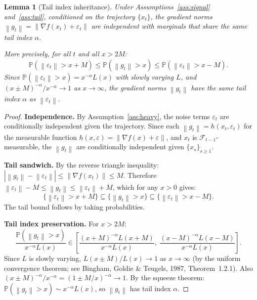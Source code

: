 \documentclass[11pt]{article}
\newtheorem{lemma}[theorem]{Lemma}
\theoremstyle{definition}
\newcommand{\Prob}{\mathbb{P}}
\newcommand{\norm}[1]{\left\| #1 \right\|}
\newcommand{\abs}[1]{\left| #1 \right|}
\newcommand{\Filt}{\mathcal{F}}
\begin{document}
\begin{lemma}[Tail index inheritance]\label{lem:tail_inherit}
Under Assumptions~\ref{ass:signal} and~\ref{ass:tail}, conditioned on the
trajectory $\{x_t\}$, the gradient norms
$\norm{g_t} = \norm{\nabla f(x_t) + \varepsilon_t}$
are independent with marginals that share the same tail index $\alpha$.

More precisely, for all $t$ and all $x > 2M$:
\[
  \Prob(\norm{\varepsilon_t} > x + M)
  \leq \Prob(\norm{g_t} > x)
  \leq \Prob(\norm{\varepsilon_t} > x - M).
\]
Since $\Prob(\norm{\varepsilon_t} > x) = x^{-\alpha}L(x)$ with slowly varying $L$,
and $(x \pm M)^{-\alpha}/x^{-\alpha} \to 1$ as $x \to \infty$, the gradient
norms $\norm{g_t}$ have the same tail index $\alpha$ as $\norm{\varepsilon_t}$.
\end{lemma}

\begin{proof}
\textbf{Independence.} By Assumption~\ref{ass:heavy}, the noise terms
$\varepsilon_t$ are conditionally independent given the trajectory. Since
each $\norm{g_t} = h(x_t, \varepsilon_t)$ for the measurable function
$h(x, \varepsilon) = \norm{\nabla f(x) + \varepsilon}$, and $x_t$ is
$\Filt_{t-1}$-measurable, the $\norm{g_t}$ are conditionally independent
given $\{x_s\}_{s \geq 1}$.

\textbf{Tail sandwich.} By the reverse triangle inequality:
$\abs{\norm{g_t} - \norm{\varepsilon_t}} \leq \norm{\nabla f(x_t)} \leq M$.
Therefore $\norm{\varepsilon_t} - M \leq \norm{g_t} \leq \norm{\varepsilon_t} + M$,
which for any $x > 0$ gives:
\[
  \{\norm{\varepsilon_t} > x + M\} \subseteq \{\norm{g_t} > x\}
  \subseteq \{\norm{\varepsilon_t} > x - M\}.
\]
The tail bound follows by taking probabilities.

\textbf{Tail index preservation.} For $x > 2M$:
\[
  \frac{\Prob(\norm{g_t} > x)}{x^{-\alpha}L(x)}
  \in \left[
    \frac{(x+M)^{-\alpha}L(x+M)}{x^{-\alpha}L(x)},\;
    \frac{(x-M)^{-\alpha}L(x-M)}{x^{-\alpha}L(x)}
  \right].
\]
Since $L$ is slowly varying, $L(x \pm M)/L(x) \to 1$ as $x \to \infty$
(by the uniform convergence theorem; see Bingham, Goldie \& Teugels, 1987,
Theorem~1.2.1). Also $(x \pm M)^{-\alpha}/x^{-\alpha}
= (1 \pm M/x)^{-\alpha} \to 1$. By the squeeze theorem:
$\Prob(\norm{g_t} > x) \sim x^{-\alpha}L(x)$, so $\norm{g_t}$ has tail
index $\alpha$.
\end{proof}
\end{document}
